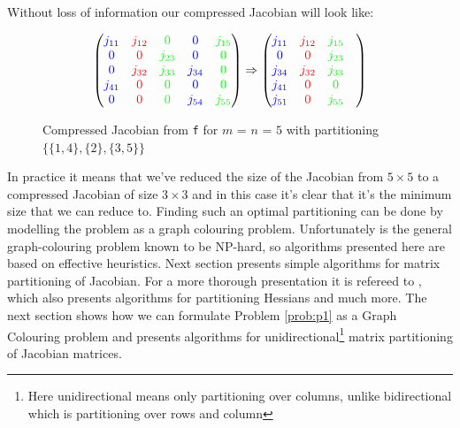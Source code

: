 	Without loss of information our compressed Jacobian will look like: 
	\begin{figure}[H]
		$$ \left(\begin{matrix}
		{\color{blue} j_{11}} & {\color{red} j_{12}} & {\color{green} 0 }        & 
		{\color{blue} 0 }       & {\color{green} j_{15}} \\
		{\color{blue} 0}        & {\color{red} 0 }       & {\color{green} j_{23}}  & 
		{\color{blue} 0 }      & {\color{green} 0} \\
		{\color{blue} 0}        & {\color{red}j_{32}} &  {\color{green} j_{33}}  &
		{\color{blue} j_{34}} & {\color{green} 0 } \\
		{\color{blue} j_{41}} & {\color{red} 0 }       & {\color{green} 0 }         &
		{\color{blue} 0 }        & {\color{green} 0} \\
		{\color{blue} 0 }       & {\color{red} 0 }       & {\color{green} 0 }         &
		{\color{blue} j_{54}} & {\color{green} j_{55} }
		\end{matrix}\right) \Rightarrow \left(\begin{matrix}
		{\color{blue} j_{11}} & {\color{red} j_{12}} & {\color{green} j_{15}} \\
		{\color{blue} 0} & {\color{red} 0} & {\color{green} j_{23}} \\
		{\color{blue} j_{34}} & {\color{red} j_{32}} & {\color{green} j_{33}}  \\
		{\color{blue} j_{41}} & {\color{red} 0} & {\color{green} 0}  \\
		{\color{blue} j_{51}} & {\color{red} 0} & {\color{green} j_{55}} &  
		\end{matrix}\right) $$
		\caption{Compressed Jacobian from \texttt{f} for $m$ = $n$ = $5$ with
			partitioning $\{\{1,4\}, \{2\}, \{3,5\}\}$}
		\label{fig:Jacob_partition}
	\end{figure}
	In practice it means that we've reduced the size of the Jacobian from $5 \times
	5$ to a compressed Jacobian of size $3 \times 3$ and in this case it's clear
	that it's the minimum size that we can reduce to. Finding such an optimal
	partitioning can be done
	by modelling the problem as a graph colouring problem.  Unfortunately is 
	the general graph-colouring problem known to be NP-hard, so algorithms presented
	here are based on effective heuristics. Next section presents simple algorithms
	for matrix partitioning of Jacobian. For a more thorough presentation it is
	refereed to \cite{Jacobian}, which also presents algorithms for 
	partitioning Hessians and much more. The next section shows how we can formulate
	Problem \ref{prob:p1} as a 
	Graph Colouring problem and presents algorithms for unidirectional\footnote{Here
		unidirectional means only partitioning over columns, unlike bidirectional which
		is partitioning over rows and column} matrix partitioning of Jacobian matrices. 
	
